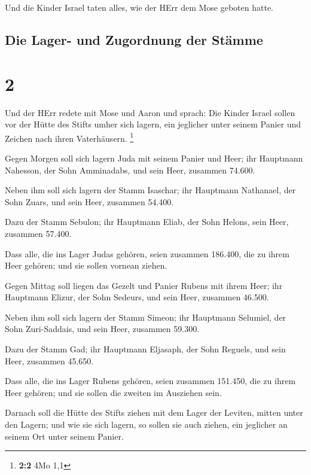  Und die Kinder Israel taten alles, wie der HErr dem Mose
geboten hatte.

\hypertarget{die-lager--und-zugordnung-der-stuxe4mme}{%
\subsection{Die Lager- und Zugordnung der
Stämme}\label{die-lager--und-zugordnung-der-stuxe4mme}}

\hypertarget{section-1}{%
\section{2}\label{section-1}}

 Und der HErr redete mit Mose und Aaron und sprach:
 Die Kinder Israel sollen vor der Hütte des Stifts umher
sich lagern, ein jeglicher unter seinem Panier und Zeichen nach ihren
Vaterhäusern. \footnote{\textbf{2:2} 4Mo 1,1}

 Gegen Morgen soll sich lagern Juda mit seinem Panier und
Heer; ihr Hauptmann Nahesson, der Sohn Amminadabs,  und
sein Heer, zusammen 74.600.

 Neben ihm soll sich lagern der Stamm Isaschar; ihr
Hauptmann Nathanael, der Sohn Zuars,  und sein Heer,
zusammen 54.400.

 Dazu der Stamm Sebulon; ihr Hauptmann Eliab, der Sohn
Helons,  sein Heer, zusammen 57.400.

 Dass alle, die ins Lager Judas gehören, seien zusammen
186.400, die zu ihrem Heer gehören; und sie sollen vornean ziehen.

 Gegen Mittag soll liegen das Gezelt und Panier Rubens
mit ihrem Heer; ihr Hauptmann Elizur, der Sohn Sedeurs, 
und sein Heer, zusammen 46.500.

 Neben ihm soll sich lagern der Stamm Simeon; ihr
Hauptmann Selumiel, der Sohn Zuri-Saddais,  und sein
Heer, zusammen 59.300.

 Dazu der Stamm Gad; ihr Hauptmann Eljasaph, der Sohn
Reguels,  und sein Heer, zusammen 45.650.

 Dass alle, die ins Lager Rubens gehören, seien zusammen
151.450, die zu ihrem Heer gehören; und sie sollen die zweiten im
Ausziehen sein.

 Darnach soll die Hütte des Stifts ziehen mit dem Lager
der Leviten, mitten unter den Lagern; und wie sie sich lagern, so sollen
sie auch ziehen, ein jeglicher an seinem Ort unter seinem Panier.

